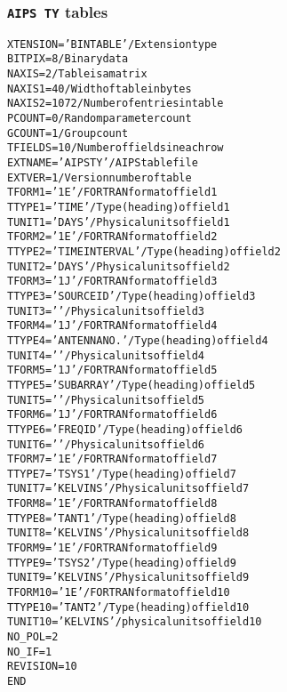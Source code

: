 \documentclass[twoside]{article}
\begin{document}
\subsubsection{{\tt AIPS TY} tables}
\label{Appe:TYtable}
\begin{alltt}
XTENSION= 'BINTABLE'           / Extension type
BITPIX  =                    8 / Binary data
NAXIS   =                    2 / Table is a matrix
NAXIS1  =                   40 / Width of table in bytes
NAXIS2  =                 1072 / Number of entries in table
PCOUNT  =                    0 / Random parameter count
GCOUNT  =                    1 / Group count
TFIELDS =                   10 / Number of fields in each row
EXTNAME = 'AIPS TY '           / AIPS table file
EXTVER  =                    1 / Version number of table
TFORM1  = '1E      '           / FORTRAN format of field  1
TTYPE1  = 'TIME            '   / Type (heading) of field  1
TUNIT1  = 'DAYS    '           / Physical units of field  1
TFORM2  = '1E      '           / FORTRAN format of field  2
TTYPE2  = 'TIME INTERVAL   '   / Type (heading) of field  2
TUNIT2  = 'DAYS    '           / Physical units of field  2
TFORM3  = '1J      '           / FORTRAN format of field  3
TTYPE3  = 'SOURCE ID       '   / Type (heading) of field  3
TUNIT3  = '        '           / Physical units of field  3
TFORM4  = '1J      '           / FORTRAN format of field  4
TTYPE4  = 'ANTENNA NO.     '   / Type (heading) of field  4
TUNIT4  = '        '           / Physical units of field  4
TFORM5  = '1J      '           / FORTRAN format of field  5
TTYPE5  = 'SUBARRAY        '   / Type (heading) of field  5
TUNIT5  = '        '           / Physical units of field  5
TFORM6  = '1J      '           / FORTRAN format of field  6
TTYPE6  = 'FREQ ID         '   / Type (heading) of field  6
TUNIT6  = '        '           / Physical units of field  6
TFORM7  = '1E      '           / FORTRAN format of field  7
TTYPE7  = 'TSYS 1          '   / Type (heading) of field  7
TUNIT7  = 'KELVINS '           / Physical units of field  7
TFORM8  = '1E      '           / FORTRAN format of field  8
TTYPE8  = 'TANT 1          '   / Type (heading) of field  8
TUNIT8  = 'KELVINS '           / Physical units of field  8
TFORM9  = '1E      '           / FORTRAN format of field  9
TTYPE9  = 'TSYS 2          '   / Type (heading) of field  9
TUNIT9  = 'KELVINS '           / Physical units of field  9
TFORM10 = '1E      '           / FORTRAN format of field 10
TTYPE10 = 'TANT 2          '   / Type (heading) of field 10
TUNIT10 = 'KELVINS '           / physical units of field 10
NO_POL  =            2
NO_IF   =            1
REVISION=           10
END
\end{alltt}
\end{document}

